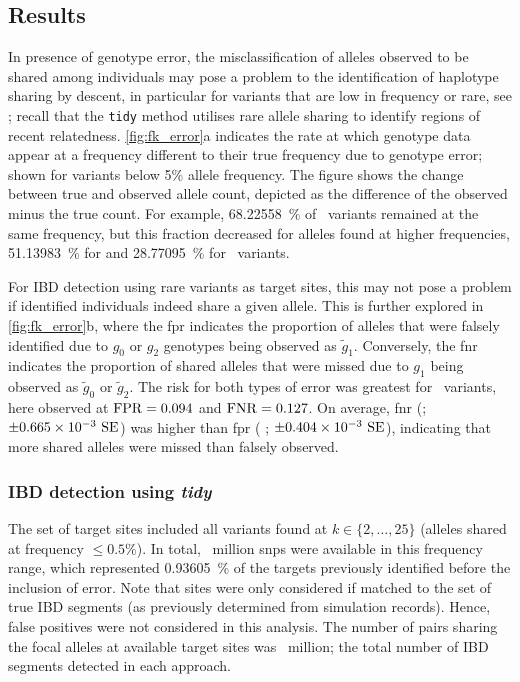 %
\subsection{Results}
\label{sec:ibd_results_err}
%

In presence of genotype error, the misclassification of alleles observed to be shared among individuals may pose a problem to the identification of haplotype sharing by descent, in particular for variants that are low in frequency or rare, see ; recall that the \texttt{tidy} method utilises rare allele sharing to identify regions of recent relatedness.
\cref{fig:fk_error}{a} indicates the rate at which genotype data appear at a frequency different to their true frequency due to genotype error; shown for variants below 5\% allele frequency.
The figure shows the change between true and observed allele count, depicted as the difference of the observed minus the true count.
For example, \SI{68.22558}{\percent} of ~variants remained at the same frequency, but this fraction decreased for alleles found at higher frequencies, \eg \SI{51.13983}{\percent} for  and \SI{28.77095}{\percent} for ~variants.

%

%

For IBD detection using rare variants as target sites, this may not pose a problem if identified individuals indeed share a given allele.
This is further explored in \cref{fig:fk_error}{b}, where the \gls{fpr} indicates the proportion of alleles that were falsely identified due to $g_0$ or $g_2$ genotypes being observed as $\tilde{g}_1$.
Conversely, the \gls{fnr} indicates the proportion of shared alleles that were missed due to $g_1$ being observed as $\tilde{g}_0$ or $\tilde{g}_2$.
The risk for both types of error was greatest for ~variants, here observed at ${\operatorname{FPR}=\dec{0.09356644}}$ and ${\operatorname{FNR}=\dec{0.126583}}$.
On average, \gls{fnr}  (; ${\pm \dec{0.665030e-3}~\text{SE}}$) was higher than \gls{fpr} ( ; ${\pm \dec{0.403969e-3}~\text{SE}}$), indicating that more shared alleles were missed than falsely observed.



%
\subsubsection{IBD detection using \emph{tidy}}
%

The set of target sites included all \fk{} variants found at ${k \in \lbrace 2, \ldots, 25 \rbrace}$ (\ie alleles shared at frequency ${\leq 0.5\%}$).
In total, ~million \glspl{snp} were available in this frequency range, which represented \SI{0.93605}{\percent} of the targets previously identified before the inclusion of error.
Note that sites were only considered if matched to the set of true IBD segments (as previously determined from simulation records).
Hence, false positives were not considered in this analysis.
The number of pairs sharing the focal alleles at available target sites was ~million; \ie the total number of IBD segments detected in each approach.

